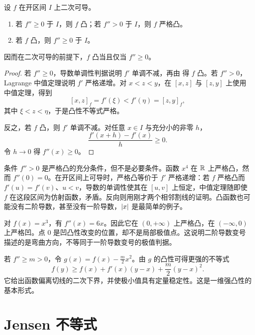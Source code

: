 \begin{theorem}[二阶导数判据]
\label{thm:convex-second-derivative}
设 \(f\) 在开区间 \(I\) 上二次可导。
\begin{enumerate}
 \item 若 \(f''\ge0\) 于 \(I\)，则 \(f\) 凸；若 \(f''>0\) 于 \(I\)，则 \(f\) 严格凸。
 \item 若 \(f\) 凸，则 \(f''\ge0\) 于 \(I\)。
\end{enumerate}
因而在二次可导的前提下，\(f\) 凸当且仅当 \(f''\ge0\)。
\end{theorem}

\begin{proof}
若 \(f''\ge0\)，导数单调性判据说明 \(f'\) 单调不减，再由  得 \(f\) 凸。若 \(f''>0\)，Lagrange 中值定理说明 \(f'\) 严格递增。对 \(x<z<y\)，在 \([x,z]\) 与 \([z,y]\) 上使用中值定理，得到
\[
 [x,z]_f=f'(\xi)<f'(\eta)=[z,y]_f,
\]
其中 \(\xi<z<\eta\)，于是凸性不等式严格。

反之，若 \(f\) 凸，则 \(f'\) 单调不减。对任意 \(x\in I\) 与充分小的非零 \(h\)，
\[
 \frac{f'(x+h)-f'(x)}h\ge0.
\]
令 \(h\to0\) 得 \(f''(x)\ge0\)。
\end{proof}

条件 \(f''>0\) 是严格凸的充分条件，但不是必要条件。函数 \(x^4\) 在 \(\mathbb{R}\) 上严格凸，然而 \(f''(0)=0\)。在开区间上可导时，严格凸等价于 \(f'\) 严格递增：若 \(f\) 严格凸而 \(f'(u)=f'(v)\)、\(u<v\)，导数的单调性使其在 \([u,v]\) 上恒定，中值定理随即使 \(f\) 在这段区间为仿射函数，矛盾。反向则用刚才两个相邻割线的证明。凸函数也可能没有二阶导数，甚至没有一阶导数，\(\left|x\right|\) 是最简单的例子。

\begin{example}[函数的凹凸区间]
对 \(f(x)=x^3\)，有 \(f''(x)=6x\)。因此它在 \((0,+\infty)\) 上严格凸，在 \((-\infty,0)\) 上严格凹。点 \(0\) 是凹凸性改变的位置，却不是局部极值点。这说明二阶导数变号描述的是弯曲方向，不等同于一阶导数变号的极值判据。
\end{example}

若 \(f''\ge m>0\)，令 \(g(x)=f(x)-\frac m2x^2\)。由 \(g\) 的凸性可得更强的不等式
\begin{equation}
 f(y)\ge f(x)+f'(x)(y-x)+\frac m2(y-x)^2.
 \label{eq:strong-convexity-one-dimensional}
\end{equation}
它给出函数偏离切线的二次下界，并使极小值具有定量稳定性。这是一维强凸性的基本形式。

\section{Jensen 不等式}

